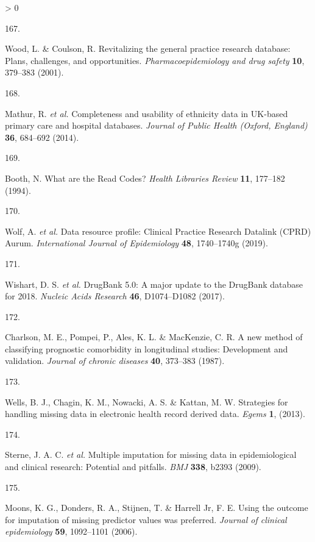 \documentclass[a4paper, twoside]{templates/ociamthesis}
\newlength{\cslhangindent}
\newlength{\csllabelwidth}
\newenvironment{CSLReferences}[3] %
 {%
  \setlength{\parindent}{0pt}
  \ifodd #1 \everypar{\setlength{\hangindent}{\cslhangindent}}\ignorespaces\fi
  \ifnum #2 > 0
  \setlength{\parskip}{#2\baselineskip}
  \fi
 }%
 {}
\newcommand{\CSLLeftMargin}[1]{\parbox[t]{\maxof{\widthof{#1}}{\csllabelwidth}}{#1}}
\newcommand{\CSLRightInline}[1]{\parbox[t]{\linewidth - \csllabelwidth}{#1}}
\begin{document}
\begin{CSLReferences}{0}{0}
\leavevmode\hypertarget{ref-wood2001revitalizing}{}%
\CSLLeftMargin{167. }
\CSLRightInline{Wood, L. \& Coulson, R. Revitalizing the general practice research database: Plans, challenges, and opportunities. \emph{Pharmacoepidemiology and drug safety} \textbf{10}, 379--383 (2001).}

\leavevmode\hypertarget{ref-mathur2014}{}%
\CSLLeftMargin{168. }
\CSLRightInline{Mathur, R. \emph{et al.} Completeness and usability of ethnicity data in {UK}-based primary care and hospital databases. \emph{Journal of Public Health (Oxford, England)} \textbf{36}, 684--692 (2014).}

\leavevmode\hypertarget{ref-booth1994}{}%
\CSLLeftMargin{169. }
\CSLRightInline{Booth, N. What are the {Read Codes}? \emph{Health Libraries Review} \textbf{11}, 177--182 (1994).}

\leavevmode\hypertarget{ref-wolf2019}{}%
\CSLLeftMargin{170. }
\CSLRightInline{Wolf, A. \emph{et al.} Data resource profile: {Clinical Practice Research Datalink} ({CPRD}) {Aurum}. \emph{International Journal of Epidemiology} \textbf{48}, 1740--1740g (2019).}

\leavevmode\hypertarget{ref-wishart2017}{}%
\CSLLeftMargin{171. }
\CSLRightInline{Wishart, D. S. \emph{et al.} {DrugBank} 5.0: A major update to the {DrugBank} database for 2018. \emph{Nucleic Acids Research} \textbf{46}, D1074--D1082 (2017).}

\leavevmode\hypertarget{ref-charlson1987new}{}%
\CSLLeftMargin{172. }
\CSLRightInline{Charlson, M. E., Pompei, P., Ales, K. L. \& MacKenzie, C. R. A new method of classifying prognostic comorbidity in longitudinal studies: Development and validation. \emph{Journal of chronic diseases} \textbf{40}, 373--383 (1987).}

\leavevmode\hypertarget{ref-wells2013strategies}{}%
\CSLLeftMargin{173. }
\CSLRightInline{Wells, B. J., Chagin, K. M., Nowacki, A. S. \& Kattan, M. W. Strategies for handling missing data in electronic health record derived data. \emph{Egems} \textbf{1}, (2013).}

\leavevmode\hypertarget{ref-sterne2009}{}%
\CSLLeftMargin{174. }
\CSLRightInline{Sterne, J. A. C. \emph{et al.} Multiple imputation for missing data in epidemiological and clinical research: Potential and pitfalls. \emph{BMJ} \textbf{338}, b2393 (2009).}

\leavevmode\hypertarget{ref-moons2006using}{}%
\CSLLeftMargin{175. }
\CSLRightInline{Moons, K. G., Donders, R. A., Stijnen, T. \& Harrell Jr, F. E. Using the outcome for imputation of missing predictor values was preferred. \emph{Journal of clinical epidemiology} \textbf{59}, 1092--1101 (2006).}


\end{CSLReferences}
\end{document}
